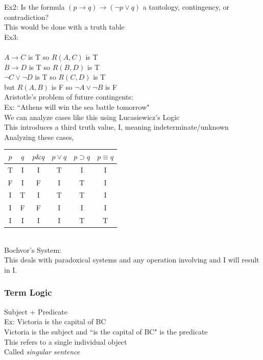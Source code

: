 Ex2: Is the formula $(p\to q)\to(\lnot p\vee q)$ a tautology, contingency, or contradiction?\\
This would be done with a truth table\\

Ex3:\\
\\
$A\to C$ is T so $R(A,C)$ is T\\
$B\to D$ is T so $R(B,D)$ is T\\
$\lnot C\vee \lnot D$ is T so $R(C,D)$ is T\\
but $R(A,B)$ is F so $\lnot A\vee\lnot B$ is F\\

Aristotle's problem of future contingents:\\
Ex: ``Athens will win the sea battle tomorrow"\\
We can analyze cases like this using Lucasiewicz's Logic\\
This introduces a third truth value, I, meaning indeterminate/unknown\\
Analyzing these cases,\\
\begin{tabular}{cc|cccc}
    $p$ & $q$ & $p\& q$ & $p\vee q$ & $p\supset q$ & $p\equiv q$\\
    \hline
    T & I & I & T & I & I\\
    F & I & F & I & T & I\\
    I & T & I & T & T & I\\
    I & F & F & I & I & I\\
    I & I & I & I & T & T
\end{tabular}\\

Bochvor's System:\\
This deals with paradoxical systems and any operation involving and I will result in I.

\subsubsection{Term Logic}

Subject + Predicate\\
Ex: Victoria is the capital of BC\\
Victoria is the subject and ``is the capital of BC" is the predicate\\
This refers to a single individual object\\
Called \textit{singular sentence}\\

